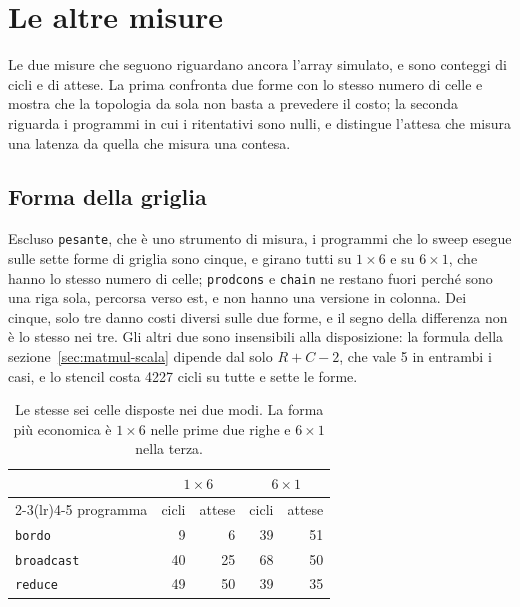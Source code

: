\section{Le altre misure}
\label{sec:altre-misure}

Le due misure che seguono riguardano ancora l'array simulato, e sono conteggi
di cicli e di attese. La prima confronta due forme con lo stesso numero di
celle e mostra che la topologia da sola non basta a prevedere il costo; la
seconda riguarda i programmi in cui i ritentativi sono nulli, e distingue
l'attesa che misura una latenza da quella che misura una contesa.

\subsection{Forma della griglia}

Escluso \texttt{pesante}, che è uno strumento di misura, i programmi che lo
sweep esegue sulle sette forme di griglia sono cinque, e girano tutti su
$1\times6$ e su $6\times1$, che hanno lo stesso numero di celle;
\texttt{prodcons} e \texttt{chain} ne restano fuori perché sono una riga sola,
percorsa verso est, e non hanno una versione in colonna. Dei cinque, solo tre
danno costi diversi sulle due forme, e il segno della differenza non è lo stesso nei tre. Gli altri due sono
insensibili alla disposizione: la formula della
sezione~\ref{sec:matmul-scala} dipende dal solo $R+C-2$, che vale 5 in entrambi
i casi, e lo stencil costa 4227 cicli su tutte e sette le forme.

\begin{table}[htbp]
    \centering
    \begin{tabular}{lrrrr}
        \toprule
        & \multicolumn{2}{c}{$1\times6$} & \multicolumn{2}{c}{$6\times1$} \\
        \cmidrule(lr){2-3}\cmidrule(lr){4-5}
        programma & cicli & attese & cicli & attese \\
        \midrule
        \texttt{bordo}     & 9  & 6  & 39 & 51 \\
        \texttt{broadcast} & 40 & 25 & 68 & 50 \\
        \texttt{reduce}    & 49 & 50 & 39 & 35 \\
        \bottomrule
    \end{tabular}
    \caption[Le stesse sei celle disposte nei due modi]{Le stesse sei celle
             disposte nei due modi. La forma più economica è $1\times6$ nelle
             prime due righe e $6\times1$ nella terza.}
    \label{tab:forma}
\end{table}

